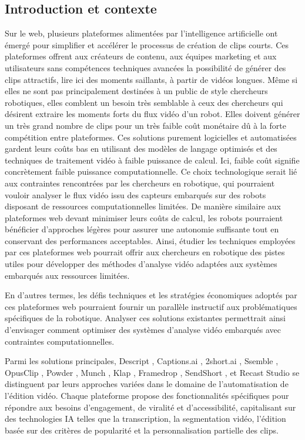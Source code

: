 \subsection{Introduction et contexte}
Sur le web, plusieurs plateformes alimentées par l’intelligence artificielle ont émergé pour simplifier et accélérer le processus de création de clips courts. Ces plateformes offrent aux créateurs de contenu, aux équipes marketing et aux utilisateurs sans compétences techniques avancées la possibilité de générer des clips attractifs, lire ici des moments saillants, à partir de vidéos longues. Même si elles ne sont pas principalement destinées à un public de style chercheurs robotiques, elles comblent un besoin très semblable à ceux des chercheurs qui désirent extraire les moments forts du flux vidéo d’un robot. Elles doivent générer un très grand nombre de clips pour un très faible coût monétaire dû à la forte compétition entre plateformes. Ces solutions purement logicielles et automatisées gardent leurs coûts bas en utilisant des modèles de langage optimisés et des techniques de traitement vidéo à faible puissance de calcul. Ici, faible coût signifie concrètement faible puissance computationnelle. Ce choix technologique serait lié aux contraintes rencontrées par les chercheurs en robotique, qui pourraient vouloir analyser le flux vidéo issu des capteurs embarqués sur des robots disposant de ressources computationnelles limitées. De manière similaire aux plateformes web devant minimiser leurs coûts de calcul, les robots pourraient bénéficier d'approches légères pour assurer une autonomie suffisante tout en conservant des performances acceptables. Ainsi, étudier les techniques employées par ces plateformes web pourrait offrir aux chercheurs en robotique des pistes utiles pour développer des méthodes d'analyse vidéo adaptées aux systèmes embarqués aux ressources limitées.

En d'autres termes, les défis techniques et les stratégies économiques adoptés par ces plateformes web pourraient fournir un parallèle instructif aux problématiques spécifiques de la robotique. Analyser ces solutions existantes permettrait ainsi d'envisager comment optimiser des systèmes d'analyse vidéo embarqués avec contraintes computationnelles.

Parmi les solutions principales, Descript \cite{descript2024}, Captions.ai \cite{captions2024}, 2short.ai \cite{short2024}, Ssemble \cite{ssemble2024}, OpusClip \cite{opusclip2024}, Powder \cite{powder2024}, Munch \cite{munch2024}, Klap \cite{klap2024}, Framedrop \cite{framedrop2024}, SendShort \cite{sendshort2024}, et Recast Studio \cite{recast2024} se distinguent par leurs approches variées dans le domaine de l’automatisation de l’édition vidéo. Chaque plateforme propose des fonctionnalités spécifiques pour répondre aux besoins d’engagement, de viralité et d’accessibilité, capitalisant sur des technologies IA telles que la transcription, la segmentation vidéo, l’édition basée sur des critères de popularité et la personnalisation partielle des clips.

